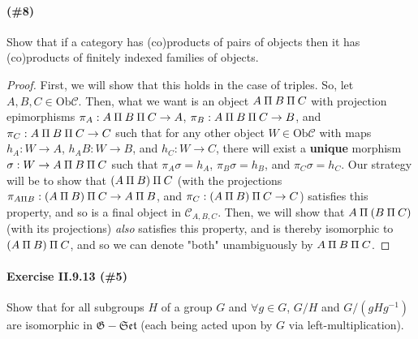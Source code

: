 \documentclass[12pt,letterpaper]{article}
\newcommand{\invamalg}{\mathbin{\text{\rotatebox[origin=c]{180}{$\amalg$}}}}
\begin{document}
\paragraph{(\#8)} Show that if a category has (co)products of pairs of objects then it has (co)products of finitely indexed families of objects.
\begin{proof}
	First, we will show that this holds in the case of triples. So, let $A,B,C \in \mathrm{Ob }\mathscr{C}$. Then, what we want is an object $A\invamalg B\invamalg C$ with projection epimorphisms $\pi_A : A\invamalg B\invamalg C \rightarrow A$, $\pi_B : A\invamalg B\invamalg C \rightarrow B$, and $\pi_C : A\invamalg B\invamalg C \rightarrow C$ such that for any other object $W \in \mathrm{Ob }\mathscr{C}$ with maps $h_A : W \rightarrow A$, $h_AB : W \rightarrow B$, and $h_C : W \rightarrow C$, there will exist a \textbf{unique} morphism $\sigma : W \rightarrow A\invamalg B\invamalg C$ such that $\pi_A\sigma = h_A$, $\pi_B\sigma = h_B$, and $\pi_C\sigma = h_C$. Our strategy will be to show that $(A\invamalg B)\invamalg C$ (with the projections $\pi_{A\invamalg B}:(A\invamalg B)\invamalg C \rightarrow A\invamalg B$, and $\pi_{C}:(A\invamalg B)\invamalg C \rightarrow C$) satisfies this property, and so is a final object in $\mathscr{C}_{A,B,C}$. Then, we will show that $A\invamalg (B\invamalg C)$ (with its projections) \textit{also} satisfies this property, and is thereby isomorphic to $(A\invamalg B)\invamalg C$, and so we can denote "both" unambiguously by $A\invamalg B\invamalg C$.
\end{proof}










\pagebreak
\paragraph{Exercise II.9.13 (\#5)} Show that for all subgroups $H$ of a group $G$ and $\forall g\in G$, $G/H$ and $G/(gHg^{-1})$ are isomorphic in $\mathfrak{G-Set}$ (each being acted upon by $G$ via left-multiplication).
\end{document}

